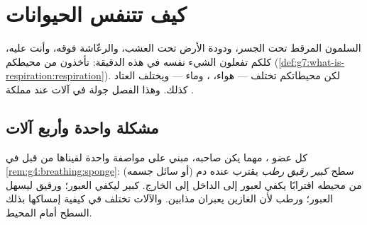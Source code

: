 \chapter{كيف تتنفس الحيوانات}\label{ch:g7:how-animals-breathe}

السلمون المرقط تحت الجسر، ودودة الأرض تحت العشب، والرعّاشة فوقه،
وأنت عليه، كلكم تفعلون الشيء نفسه في هذه الدقيقة: تأخذون 
من محيطكم (\cref{def:g7:what-is-respiration:respiration}). لكن
محيطاتكم تختلف --- هواء، ، وماء --- ويختلف العتاد كذلك. وهذا
الفصل جولة في آلات  عند مملكة .

\section{مشكلة واحدة وأربع آلات}

\begin{proposition}\label{prop:g7:how-animals-breathe:spec}
كل عضو ، مهما يكن صاحبه، مبني على مواصفة واحدة لقيناها من قبل
في \cref{rem:g4:breathing:sponge}: سطح \emph{كبير}
\emph{رقيق} \emph{رطب} يقترب عنده دم  (أو سائل جسمه) من
محيطه اقترابًا يكفي لعبور  إلى الداخل 
إلى الخارج. كبير ليكفي العبور؛ ورقيق ليسهل العبور؛ ورطب لأن
الغازين يعبران مذابين. والآلات تختلف في كيفية إمساكها بذلك السطح
أمام المحيط.
\end{proposition}
\admitted

